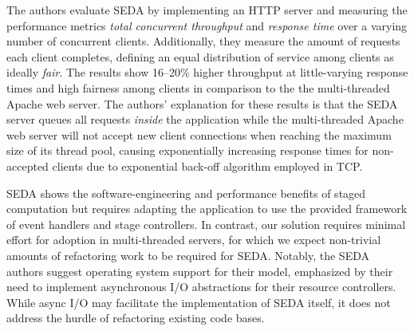 \documentclass[12pt,a4paper]{book}
\begin{document}
The authors evaluate SEDA by implementing an HTTP server and measuring the performance metrics \emph{total concurrent throughput} and \emph{response time} over a varying number of concurrent clients.
Additionally, they measure the amount of requests each client completes, defining an equal distribution of service among clients as ideally \emph{fair}. %
The results show 16--20\% higher throughput at little-varying response times and high fairness among clients in comparison to the the multi-threaded Apache web server. %
The authors' explanation for these results is that the SEDA server queues all requests \emph{inside} the application while the multi-threaded Apache web server will not accept new client connections when reaching the maximum size of its thread pool, causing exponentially increasing response times for non-accepted clients due to exponential back-off algorithm employed in TCP.~\cite{seda}

SEDA shows the software-engineering and performance benefits of staged computation but requires adapting the application to use the provided framework of event handlers and stage controllers.
In contrast, our solution requires minimal effort for adoption in multi-threaded servers, for which we expect non-trivial amounts of refactoring work to be required for SEDA.
Notably, the SEDA authors suggest operating system support for their model, emphasized by their need to implement asynchronous I/O abstractions for their resource controllers.
While async I/O may facilitate the implementation of SEDA itself, it does not address the hurdle of refactoring existing code bases.
\end{document}
